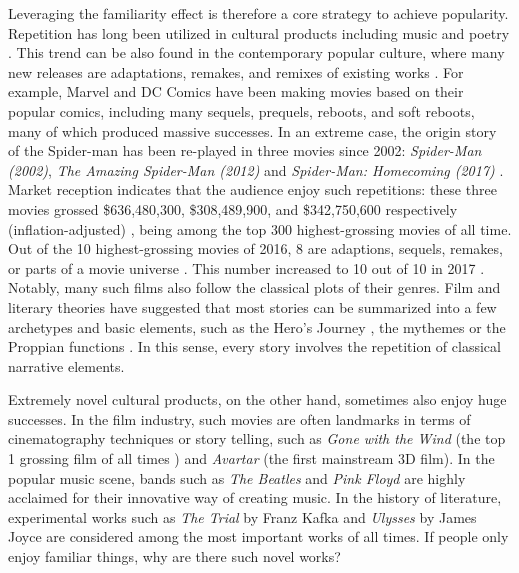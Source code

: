 \documentclass[letterpaper]{article} %
\begin{document}
Leveraging the familiarity effect is therefore a core strategy to achieve popularity. Repetition has long been utilized in cultural products including music and poetry \cite{huron2013psychological}. This trend can be also found in the contemporary popular culture, where many new releases are adaptations, remakes, and remixes of existing works \cite{manovich2007comes}. For example, Marvel and DC Comics have been making movies based on their popular comics, including many sequels, prequels, reboots, and soft reboots, many of which produced massive successes. In an extreme case, the origin story of the Spider-man has been re-played in three movies since 2002: \emph{Spider-Man (2002)}, \emph{The Amazing Spider-Man (2012)} and \emph{Spider-Man: Homecoming (2017)} \cite{spiderman}. Market reception indicates that the audience enjoy such repetitions: these three movies grossed \$636,480,300, \$308,489,900, and \$342,750,600 respectively (inflation-adjusted) \cite{spider-gross}, being among the top 300 highest-grossing movies of all time. Out of the 10 highest-grossing movies of 2016, 8 are adaptions, sequels, remakes, or parts of a movie universe \cite{2016film}. This number increased to 10 out of 10 in 2017 \cite{2017film}. Notably, many such films also follow the classical plots of their genres. Film and literary theories have suggested that most stories can be summarized into a few archetypes and basic elements, such as the Hero's Journey \cite{campbell2008hero}, the mythemes \cite{levi1955structural} or the Proppian functions \cite{propp2010morphology}. In this sense, every story involves the repetition of classical narrative elements.

Extremely novel cultural products, on the other hand, sometimes also enjoy huge successes. In the film industry, such movies are often landmarks in terms of cinematography techniques or story telling, such as \emph{Gone with the Wind} (the top 1 grossing film of all times \cite{spider-gross}) and \emph{Avartar} (the first mainstream 3D film). In the popular music scene, bands such as \emph{The Beatles} and \emph{Pink Floyd} are highly acclaimed for their innovative way of creating music. In the history of literature, experimental works such as \emph{The Trial} by Franz Kafka and \emph{Ulysses} by James Joyce are considered among the most important works of all times. If people only enjoy familiar things, why are there such novel works?
\end{document}
